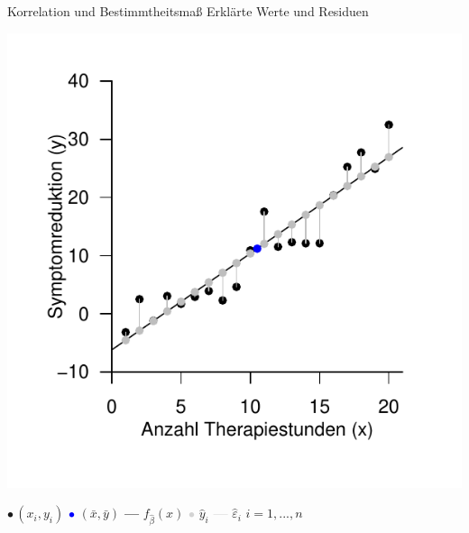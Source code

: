 \documentclass[
  8pt,
  ignorenonframetext,
]{beamer}
\begin{document}
\begin{frame}{Korrelation und Bestimmtheitsmaß}
\protect\hypertarget{korrelation-und-bestimmtheitsmauxdf-2}{}
Erklärte Werte und Residuen

\begin{center}\includegraphics[width=0.55\linewidth]{2_Abbildungen/alm_2_erklaertewerte_residuen} \end{center}

\vspace{-5mm}
\center

\(\bullet \, (x_i, y_i)\) \hspace{2mm} \textcolor{blue}{$\bullet$}
\((\bar{x},\bar{y})\) \hspace{2mm} \textbf{---} \(f_{\hat{\beta}}(x)\)
\hspace{2mm} \textcolor{lightgray}{$\bullet$} \(\hat{y}_i\) \hspace{2mm}
\textcolor{lightgray}{\textbf{---}} \(\hat{\varepsilon}_i\) \hspace{2mm}
\(i = 1,...,n\)
\end{frame}
\end{document}

